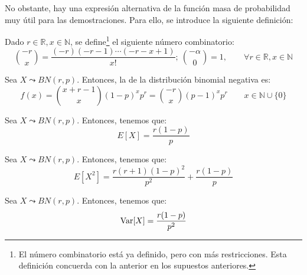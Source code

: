 No obstante, hay una expresión alternativa de la función masa de probabilidad muy útil para las demostraciones. Para ello, se introduce la siguiente definición:


\begin{definicion}
    Dado $r\in \mathbb{R}, x\in \mathbb{N}$, se define\footnote{El número combinatorio está ya definido, pero con más restricciones. Esta definición concuerda con la anterior en los supuestos anteriores.} el siguiente número combinatorio:
    \begin{equation*}
        \binom{-r}{x} = \frac{(-r)(-r-1)\cdots (-r-x+1)}{x!};~\binom{-\alpha}{0}=1, \qquad \forall r\in \mathbb{R}, x\in \mathbb{N}
    \end{equation*}
\end{definicion}


\begin{prop}
    Sea $X\leadsto BN(r,p)$. Entonces, la  de la distribución binomial negativa es:
    \begin{equation*}
        f(x)
        = \binom{x+r-1}{x}(1-p)^{x}p^r
        = \binom{-r}{x}(p-1)^xp^r
        \qquad x\in \mathbb{N}\cup \{0\}
    \end{equation*}
\end{prop}


\begin{prop}
    Sea $X\leadsto BN(r,p)$. Entonces, tenemos que:
    \begin{equation*}
        E[X]=\frac{r(1-p)}{p}
    \end{equation*}
\end{prop}

\begin{lema}
    Sea $X\leadsto BN(r,p)$. Entonces, tenemos que:
    \begin{equation*}
        E[X^2]=\frac{r(r+1)(1-p)^2}{p^2} + \frac{r(1-p)}{p}
    \end{equation*}
\end{lema}

\begin{coro}
    Sea $X\leadsto BN(r,p)$. Entonces, tenemos que:
    \begin{equation*}
        \operatorname{Var}[X]=\frac{r(1-p)}{p^2}
    \end{equation*}
\end{coro}

